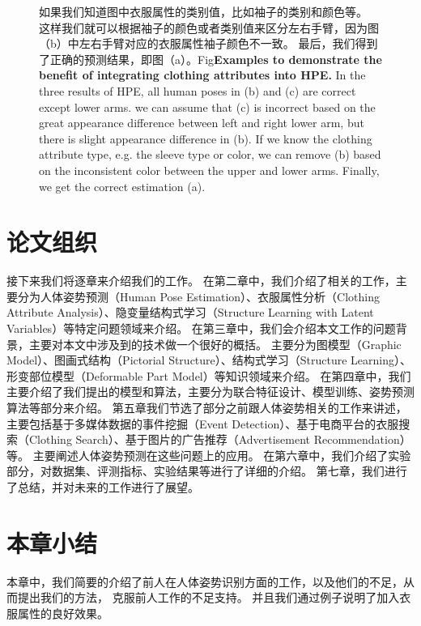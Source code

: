 \begin{figure}[tbp]
{如果我们知道图中衣服属性的类别值，比如袖子的类别和颜色等。
这样我们就可以根据袖子的颜色或者类别值来区分左右手臂，因为图（b）中左右手臂对应的衣服属性袖子颜色不一致。
最后，我们得到了正确的预测结果，即图（a）。}{Fig}{\textbf{Examples to demonstrate the benefit of integrating clothing attributes into HPE.}
In the three results of HPE, all human poses in (b) and (c) are correct except lower arms.
we can assume that (c) is incorrect based on the great appearance difference between left and right lower arm,
but there is slight appearance difference in (b).
If we know the clothing attribute type, e.g. the sleeve type or color,
we can remove (b) based on the inconsistent color between the upper and lower arms.
Finally, we get the correct estimation (a).}
    \label{fig:eg}
\end{figure}


\section{论文组织}
接下来我们将逐章来介绍我们的工作。
在第二章中，我们介绍了相关的工作，主要分为人体姿势预测（Human Pose Estimation）、衣服属性分析（Clothing Attribute Analysis）、隐变量结构式学习（Structure Learning with Latent Variables）等特定问题领域来介绍。
在第三章中，我们会介绍本文工作的问题背景，主要对本文中涉及到的技术做一个很好的概括。
主要分为图模型（Graphic Model）、图画式结构（Pictorial Structure）、结构式学习（Structure Learning）、形变部位模型（Deformable Part Model）等知识领域来介绍。
在第四章中，我们主要介绍了我们提出的模型和算法，主要分为联合特征设计、模型训练、姿势预测算法等部分来介绍。
第五章我们节选了部分之前跟人体姿势相关的工作来讲述，主要包括基于多媒体数据的事件挖掘（Event Detection）、基于电商平台的衣服搜索（Clothing Search）、基于图片的广告推荐（Advertisement Recommendation）等。
主要阐述人体姿势预测在这些问题上的应用。
在第六章中，我们介绍了实验部分，对数据集、评测指标、实验结果等进行了详细的介绍。
第七章，我们进行了总结，并对未来的工作进行了展望。

\section{本章小结}
本章中，我们简要的介绍了前人在人体姿势识别方面的工作，以及他们的不足，从而提出我们的方法，
克服前人工作的不足支持。
并且我们通过例子说明了加入衣服属性的良好效果。
